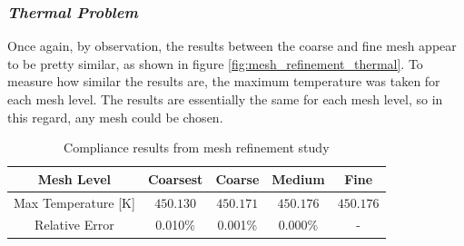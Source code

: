 \subsubsection*{\emph{Thermal Problem}}
Once again, by observation, the results between the coarse and fine mesh appear to be pretty similar, as shown in figure \ref{fig:mesh_refinement_thermal}. To measure how similar the results are, the maximum temperature was taken for each mesh level. The results are essentially the same for each mesh level, so in this regard, any mesh could be chosen.
\begin{table}[ht]
  \centering
  \begin{tabular}{c | c | c | c | c}
    Mesh Level & Coarsest & Coarse & Medium & Fine \\ \hline
    Max Temperature [K] & $450.130$ & $450.171$ & $450.176$ & $450.176$ \\ \hline
    Relative Error & 0.010\% & 0.001\% & 0.000\% & - \\ \hline
  \end{tabular}
  \caption{Compliance results from mesh refinement study}
  \label{table:mesh_refinement_temperature}
\end{table}

